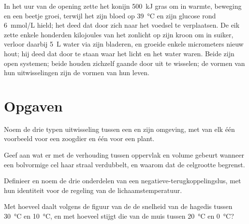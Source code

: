 \begin{example}\label{ex:b1:organism-environment:budgets}
In het uur van de opening zette het konijn \qty{500}{kJ} gras om in warmte,
beweging en een beetje groei, terwijl het zijn bloed op \qty{39}{\celsius} en
zijn glucose rond \qty{6}{mmol/L} hield; het deed dat door zich naar het
voedsel te verplaatsen. De eik zette enkele honderden kilojoules van het
zonlicht op zijn kroon om in suiker, verloor daarbij \qty{5}{L} water via zijn
bladeren, en groeide enkele micrometers nieuw hout; hij deed dat door te staan
waar het licht en het water waren. Beide zijn open systemen; beide houden
zichzelf gaande door uit te wisselen; de vormen van hun uitwisselingen zijn de
vormen van hun leven.
\end{example}

\section{Opgaven}

\begin{exercise}[$\star$]\label{exo:b1:organism-environment:1}
Noem de drie typen uitwisseling tussen een  en zijn omgeving, met
van elk één voorbeeld voor een zoogdier en één voor een plant.
\end{exercise}

\begin{exercise}[$\star$]\label{exo:b1:organism-environment:2}
Geef aan wat er met de verhouding tussen oppervlak en volume gebeurt wanneer
een bolvormige cel haar straal verdubbelt, en waarom dat de celgrootte begrenst.
\end{exercise}

\begin{exercise}[$\star$]\label{exo:b1:organism-environment:3}
Definieer  en noem de drie onderdelen van een
negatieve-terugkoppelingslus, met hun identiteit voor de regeling van de
lichaamstemperatuur.
\end{exercise}

\begin{exercise}[$\star$]\label{exo:b1:organism-environment:4}
Met hoeveel daalt volgens de figuur van de  de snelheid
van de hagedis tussen \qty{30}{\celsius} en \qty{10}{\celsius}, en met hoeveel
stijgt die van de muis tussen \qty{20}{\celsius} en \qty{0}{\celsius}?
\end{exercise}

